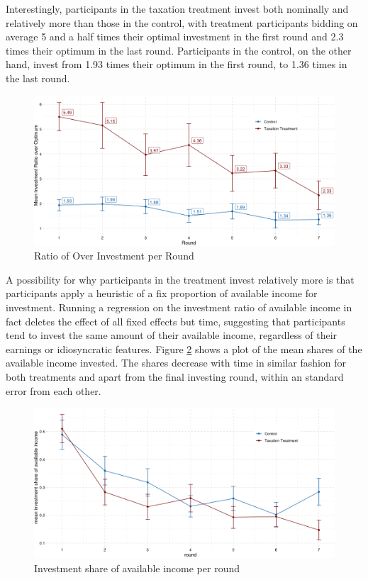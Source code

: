 Interestingly, participants in the taxation treatment invest both nominally and relatively more than those in the control, with treatment participants bidding on average 5 and a half times their optimal investment in the first round and 2.3 times their optimum in the last round. Participants in the control, on the other hand, invest from 1.93 times their optimum in the first round, to 1.36 times in the last round.\\


\begin{figure}
    \centering
    \includegraphics[width=\textwidth]{graphs/over_invest.png}
    \caption{Ratio of Over Investment per Round}
    \label{fig:over_invest}
\end{figure}


A possibility for why participants in the treatment invest relatively more is that participants apply a heuristic of a fix proportion of available income for investment. Running a regression on the investment ratio of available income in fact deletes the effect of all fixed effects but time, suggesting that participants tend to invest the same amount of their available income, regardless of their earnings or idiosyncratic features. Figure \ref{fig:invest_share} shows a plot of the mean shares of the available income invested. The shares decrease with time in similar fashion for both treatments and apart from the final investing round, within an standard error from each other.\\

\begin{figure}
    \centering
    \includegraphics[width=\textwidth]{graphs/investment_share_geom_line.png}
    \caption{Investment share of available income per round}
    \label{fig:invest_share}
\end{figure}

